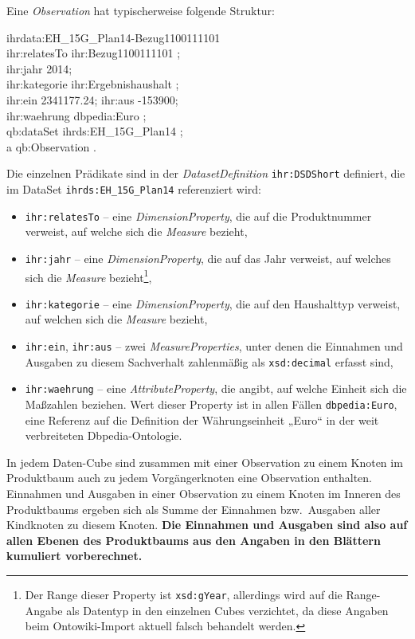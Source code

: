 \documentclass[a4paper,11pt,twoside]{article}
\begin{document}
Eine \emph{Observation} hat typischerweise folgende Struktur:
\begin{code}
ihrdata:EH\_15G\_Plan14-Bezug1100111101\+\\
    ihr:relatesTo ihr:Bezug1100111101 ;\\
    ihr:jahr {\dq}2014{\dq};\\
    ihr:kategorie ihr:Ergebnishaushalt ;\\
    ihr:ein {\dq}2341177.24{\dq}; ihr:aus {\dq}-153900{\dq};\\
    ihr:waehrung dbpedia:Euro ;\\
    qb:dataSet ihrds:EH\_15G\_Plan14 ;\\
    a qb:Observation .
\end{code}
Die einzelnen Prädikate sind in der \emph{DatasetDefinition}
\texttt{ihr:DSDShort} definiert, die im DataSet \texttt{ihrds:EH\_15G\_Plan14}
referenziert wird:
\begin{itemize}\itemsep0pt
\item \texttt{ihr:relatesTo} -- eine \emph{DimensionProperty}, die auf die
  Produktnummer verweist, auf welche sich die \emph{Measure} bezieht,
\item \texttt{ihr:jahr} -- eine \emph{DimensionProperty}, die auf das Jahr
  verweist, auf welches sich die \emph{Measure} bezieht\footnote{Der Range
    dieser Property ist \texttt{xsd:gYear}, allerdings wird auf die
    Range-Angabe als Datentyp in den einzelnen Cubes verzichtet, da diese
    Angaben beim Ontowiki-Import aktuell falsch behandelt werden.},
\item \texttt{ihr:kategorie}  -- eine \emph{DimensionProperty}, die auf den
  Haushalttyp verweist, auf welchen sich die \emph{Measure} bezieht,
\item \texttt{ihr:ein}, \texttt{ihr:aus} -- zwei \emph{MeasureProperties},
  unter denen die Einnahmen und Ausgaben zu diesem Sachverhalt zahlenmäßig als
  \texttt{xsd:decimal} erfasst sind, 
\item \texttt{ihr:waehrung} -- eine \emph{AttributeProperty}, die angibt, auf
  welche Einheit sich die Maßzahlen beziehen.  Wert dieser Property ist in
  allen Fällen \texttt{dbpedia:Euro}, eine Referenz auf die Definition der
  Währungseinheit „Euro“ in der weit verbreiteten Dbpedia-Ontologie.  
\end{itemize}
In jedem Daten-Cube sind zusammen mit einer Observation zu einem Knoten im
Produktbaum auch zu jedem Vorgängerknoten eine Observation enthalten. Einnahmen
und Ausgaben in einer Observation zu einem Knoten im Inneren des Produktbaums
ergeben sich als Summe der Einnahmen bzw.\ Ausgaben aller Kindknoten zu diesem
Knoten.  \textbf{Die Einnahmen und Ausgaben sind also auf allen Ebenen des
  Produktbaums aus den Angaben in den Blättern kumuliert vorberechnet.}
\end{document}

